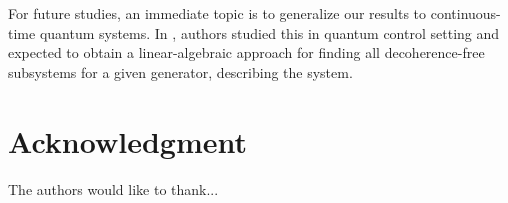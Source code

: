 \documentclass[journal]{IEEEtran}
\begin{document}
For future studies, an immediate topic is to generalize our results to continuous-time quantum systems. In \cite{ticozzi2008quantum}, authors  studied this in quantum control setting and expected to obtain a linear-algebraic approach for finding all decoherence-free subsystems  for a given generator, describing the system.
\section*{Acknowledgment}


The authors would like to thank...










%
%
%


% 
\end{document}
